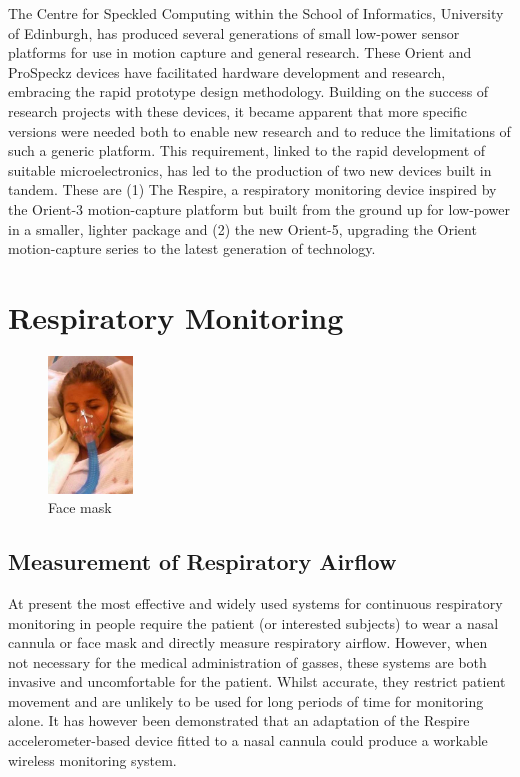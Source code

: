 The Centre for Speckled Computing within the School of Informatics, University of
Edinburgh, has produced several generations of small low-power sensor platforms for use
in motion capture and general research. These Orient and ProSpeckz devices
have facilitated hardware development and research, embracing the rapid prototype
design methodology. Building on the success of research projects with these devices, it
became apparent that more specific versions were needed both to enable new research and to
reduce the limitations of such a generic platform. This requirement, linked to the rapid development
of suitable microelectronics, has led to the production of two new devices built in tandem. These are
(1) The Respire, a respiratory monitoring device inspired by the Orient-3 motion-capture platform
but built from the ground up for low-power in a smaller, lighter package and (2) the new Orient-5,
upgrading the Orient motion-capture series to the latest generation of technology.

\section{Respiratory Monitoring}

\begin{figure}
  \vspace{-10pt}
  \begin{center}
    \includegraphics[width=0.2\textwidth, keepaspectratio=true]{images/Plastic_oxygen_mask_on_an_ER_patient.jpg}
  \end{center}
  \caption[Face Mask]{Face mask}
  \vspace{-10pt}
\end{figure}

\subsection{Measurement of Respiratory Airflow}
At present the most effective and widely used systems for continuous respiratory monitoring in
people require the patient (or interested subjects) to wear a nasal cannula or face mask and directly
measure respiratory airflow. However, when not necessary for the medical administration of gasses,
these systems are both invasive and uncomfortable for the patient. Whilst accurate, they
restrict patient movement and are unlikely to be used for long periods of time for monitoring alone.
It has however been demonstrated that an adaptation of the Respire accelerometer-based device
fitted to a nasal cannula could produce a workable wireless monitoring system.


